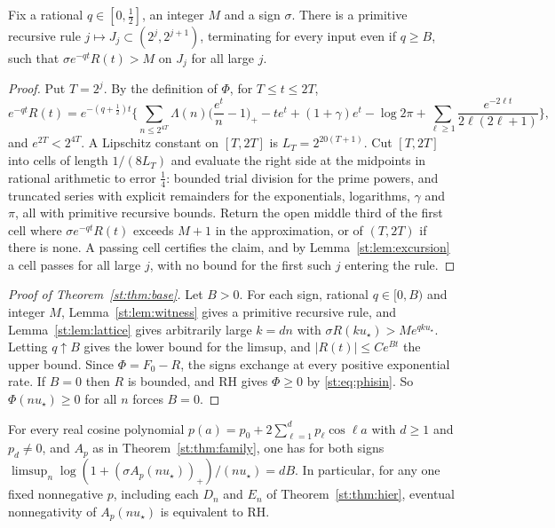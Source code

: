 \begin{lemma}\label{st:lem:witness}
Fix a rational $q\in[0,\tfrac12]$, an integer $M$ and a sign $\sigma$. There is a primitive recursive rule $j\mapsto J_j\subset(2^j,2^{j+1})$, terminating for every input even if $q\ge B$, such that $\sigma e^{-qt}R(t)>M$ on $J_j$ for all large $j$.
\end{lemma}
\begin{proof}
Put $T=2^j$. By the definition of $\Phi$, for $T\le t\le2T$,
\[
e^{-qt}R(t)=e^{-(q+\frac12)t}\Big\{\sum_{n\le2^{4T}}\Lambda(n)\Big(\frac{e^t}n-1\Big)_+-te^t+(1+\gamma)e^t-\log2\pi+\sum_{\ell\ge1}\frac{e^{-2\ell t}}{2\ell(2\ell+1)}\Big\},
\]
and $e^{2T}<2^{4T}$. A Lipschitz constant on $[T,2T]$ is $L_T=2^{20(T+1)}$. Cut $[T,2T]$ into cells of length $1/(8L_T)$ and evaluate the right side at the midpoints in rational arithmetic to error $\tfrac14$: bounded trial division for the prime powers, and truncated series with explicit remainders for the exponentials, logarithms, $\gamma$ and $\pi$, all with primitive recursive bounds. Return the open middle third of the first cell where $\sigma e^{-qt}R(t)$ exceeds $M+1$ in the approximation, or of $(T,2T)$ if there is none. A passing cell certifies the claim, and by Lemma~\ref{st:lem:excursion} a cell passes for all large $j$, with no bound for the first such $j$ entering the rule.
\end{proof}
\begin{proof}[Proof of Theorem~\ref{st:thm:base}]
Let $B>0$. For each sign, rational $q\in[0,B)$ and integer $M$, Lemma~\ref{st:lem:witness} gives a primitive recursive rule, and Lemma~\ref{st:lem:lattice} gives arbitrarily large $k=dn$ with $\sigma R(ku_\star)>Me^{qku_\star}$. Letting $q\uparrow B$ gives the lower bound for the limsup, and $|R(t)|\le Ce^{Bt}$ the upper bound. Since $\Phi=F_0-R$, the signs exchange at every positive exponential rate. If $B=0$ then $R$ is bounded, and RH gives $\Phi\ge0$ by \eqref{st:eq:phisin}. So $\Phi(nu_\star)\ge0$ for all $n$ forces $B=0$.
\end{proof}
\begin{corollary}\label{st:cor:staircase}
For every real cosine polynomial $p(a)=p_0+2\sum_{\ell=1}^dp_\ell\cos\ell a$ with $d\ge1$ and $p_d\ne0$, and $A_p$ as in Theorem~\ref{st:thm:family}, one has for both signs $\limsup_{n}\log(1+(\sigma A_p(nu_\star))_+)/(nu_\star)=dB$. In particular, for any one fixed nonnegative $p$, including each $D_n$ and $E_n$ of Theorem~\ref{st:thm:hier}, eventual nonnegativity of $A_p(nu_\star)$ is equivalent to RH.
\end{corollary}
